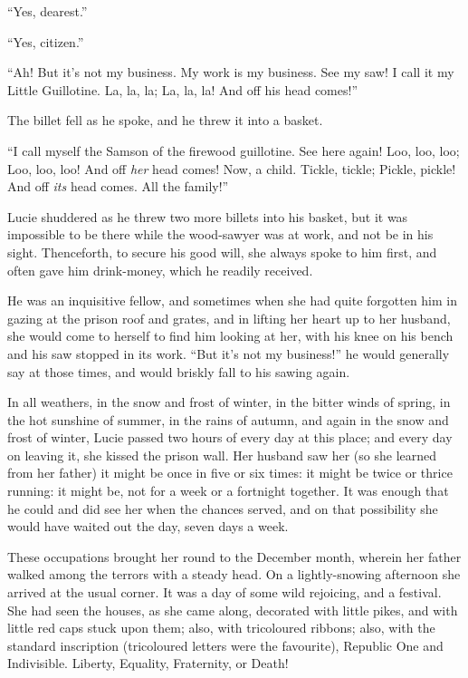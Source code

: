 ``Yes, dearest.''

``Yes, citizen.''

``Ah!  But it's not my business.  My work is my business.  See my saw!
I call it my Little Guillotine.  La, la, la; La, la, la!  And off his
head comes!''

The billet fell as he spoke, and he threw it into a basket.

``I call myself the Samson of the firewood guillotine.  See here again!
Loo, loo, loo; Loo, loo, loo!  And off \emph{her} head comes!  Now, a child.
Tickle, tickle; Pickle, pickle!  And off \emph{its} head comes.  All the family!''

Lucie shuddered as he threw two more billets into his basket, but it
was impossible to be there while the wood-sawyer was at work, and not
be in his sight.  Thenceforth, to secure his good will, she always
spoke to him first, and often gave him drink-money, which he readily
received.

He was an inquisitive fellow, and sometimes when she had quite
forgotten him in gazing at the prison roof and grates, and in lifting
her heart up to her husband, she would come to herself to find him
looking at her, with his knee on his bench and his saw stopped in its
work.  ``But it's not my business!'' he would generally say at those
times, and would briskly fall to his sawing again.

In all weathers, in the snow and frost of winter, in the bitter winds
of spring, in the hot sunshine of summer, in the rains of autumn, and
again in the snow and frost of winter, Lucie passed two hours of
every day at this place; and every day on leaving it, she kissed the
prison wall.  Her husband saw her (so she learned from her father) it
might be once in five or six times:  it might be twice or thrice running:
it might be, not for a week or a fortnight together.  It was enough
that he could and did see her when the chances served, and on that
possibility she would have waited out the day, seven days a week.

These occupations brought her round to the December month, wherein
her father walked among the terrors with a steady head.  On a
lightly-snowing afternoon she arrived at the usual corner.  It was a
day of some wild rejoicing, and a festival.  She had seen the houses,
as she came along, decorated with little pikes, and with little red
caps stuck upon them; also, with tricoloured ribbons; also, with the
standard inscription (tricoloured letters were the favourite),
Republic One and Indivisible. Liberty, Equality, Fraternity, or Death!


